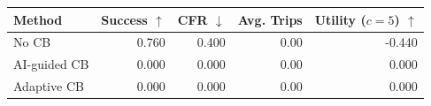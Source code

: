 \begin{tabular}{lrrrr}
\toprule
Method & Success $\uparrow$ & CFR $\downarrow$ & Avg. Trips & Utility ($c=5$) $\uparrow$ \\
\midrule
No CB & 0.760 & 0.400 & 0.00 & -0.440 \\
AI-guided CB & 0.000 & 0.000 & 0.00 & 0.000 \\
Adaptive CB & 0.000 & 0.000 & 0.00 & 0.000 \\
\bottomrule
\end{tabular}
